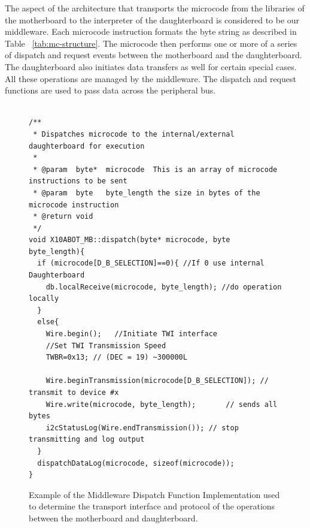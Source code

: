 	The aspect of the \xten architecture that transports the microcode from the libraries of the motherboard to the interpreter of the daughterboard is considered to be our middleware. Each microcode instruction formats the byte string as described in Table ~\ref{tab:mc-structure}. The microcode then performs one or more of a series of dispatch and request events between the motherboard and the daughterboard. The daughterboard also initiates data transfers as well for certain special cases. All these operations are managed by the middleware. The dispatch and request functions are used to pass data across the peripheral bus.
	\begin{figure}
    \footnotesize
    {\fontsize{8}{6}\selectfont
    \begin{verbatim}

/**
 * Dispatches microcode to the internal/external daughterboard for execution
 *
 * @param  byte*  microcode  This is an array of microcode instructions to be sent
 * @param  byte   byte_length the size in bytes of the microcode instruction
 * @return void
 */
void X10ABOT_MB::dispatch(byte* microcode, byte byte_length){
  if (microcode[D_B_SELECTION]==0){ //If 0 use internal Daughterboard
    db.localReceive(microcode, byte_length); //do operation locally
  }
  else{
    Wire.begin();   //Initiate TWI interface
    //Set TWI Transmission Speed
    TWBR=0x13; // (DEC = 19) ~300000L
   
    Wire.beginTransmission(microcode[D_B_SELECTION]); // transmit to device #x
    Wire.write(microcode, byte_length);       // sends all bytes
    i2cStatusLog(Wire.endTransmission()); // stop transmitting and log output
  }
  dispatchDataLog(microcode, sizeof(microcode));
}
	\end{verbatim}
    }
    \caption{Example of the Middleware Dispatch Function Implementation used to determine the transport interface and protocol of the operations between the motherboard and daughterboard.} \label{code:dispatch}
    \end{figure}

